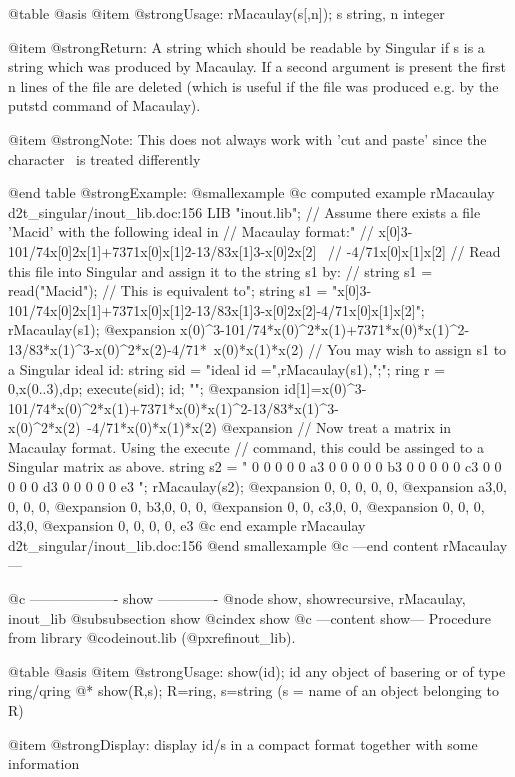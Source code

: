 @table @asis
@item @strong{Usage:}
rMacaulay(s[,n]); s string, n integer

@item @strong{Return:}
A string which should be readable by Singular if s is a string which
was produced by Macaulay. If a second argument is present the first
n lines of the file are deleted (which is useful if the file was
produced e.g. by the putstd command of Macaulay).

@item @strong{Note:}
This does not always work with 'cut and paste' since the character
\ is treated differently

@end table
@strong{Example:}
@smallexample
@c computed example rMacaulay d2t_singular/inout_lib.doc:156 
LIB "inout.lib";
// Assume there exists a file 'Macid' with the following ideal in
// Macaulay format:"
// x[0]3-101/74x[0]2x[1]+7371x[0]x[1]2-13/83x[1]3-x[0]2x[2] \
//     -4/71x[0]x[1]x[2]
// Read this file into Singular and assign it to the string s1 by:
// string s1 = read("Macid");
// This is equivalent to";
string s1 =
"x[0]3-101/74x[0]2x[1]+7371x[0]x[1]2-13/83x[1]3-x[0]2x[2]-4/71x[0]x[1]x[2]";
rMacaulay(s1);
@expansion{} x(0)^3-101/74*x(0)^2*x(1)+7371*x(0)*x(1)^2-13/83*x(1)^3-x(0)^2*x(2)-4/71*\
   x(0)*x(1)*x(2)
// You may wish to assign s1 to a Singular ideal id:
string sid = "ideal id =",rMacaulay(s1),";";
ring r = 0,x(0..3),dp;
execute(sid);
id; "";
@expansion{} id[1]=x(0)^3-101/74*x(0)^2*x(1)+7371*x(0)*x(1)^2-13/83*x(1)^3-x(0)^2*x(2)\
   -4/71*x(0)*x(1)*x(2)
@expansion{} 
// Now treat a matrix in Macaulay format. Using the execute
// command, this could be assinged to a Singular matrix as above.
string s2 = "
0  0  0  0  0
a3 0  0  0  0
0  b3 0  0  0
0  0  c3 0  0
0  0  0  d3 0
0  0  0  0  e3 ";
rMacaulay(s2);
@expansion{} 0, 0, 0, 0, 0,
@expansion{} a3,0, 0, 0, 0,
@expansion{} 0, b3,0, 0, 0,
@expansion{} 0, 0, c3,0, 0,
@expansion{} 0, 0, 0, d3,0,
@expansion{} 0, 0, 0, 0, e3
@c end example rMacaulay d2t_singular/inout_lib.doc:156
@end smallexample
@c ---end content rMacaulay---

@c ------------------- show -------------
@node show, showrecursive, rMacaulay, inout_lib
@subsubsection show
@cindex show
@c ---content show---
Procedure from library @code{inout.lib} (@pxref{inout_lib}).

@table @asis
@item @strong{Usage:}
show(id); id any object of basering or of type ring/qring
@* show(R,s); R=ring, s=string (s = name of an object belonging to R)

@item @strong{Display:}
display id/s in a compact format together with some information

